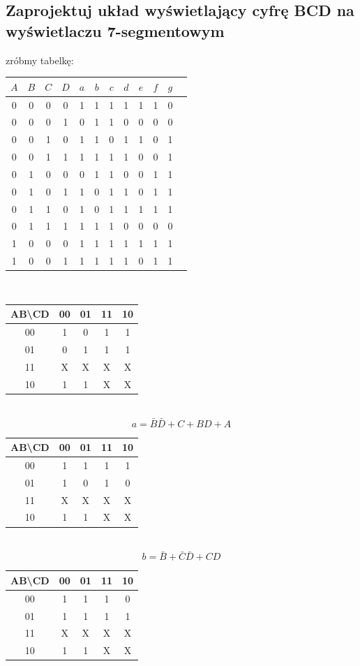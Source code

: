 \documentclass{article}
\begin{document}
\begin{enumerate}
\begin{enumerate}
	\section{Zaprojektuj układ wyświetlający cyfrę BCD na wyświetlaczu 7-segmentowym}
	zróbmy tabelkę:
	\begin{center}
	\begin{tabular}{|c|c|c|c||c|c|c|c|c|c|c|c|} 
	 \hline
	$A$ & $B$ & $C$ & $D$ & $a$ & $b$ & $c$ & $d$ & $e$ & $f$ & $g$ \\ 
	 \hline \hline
	 0&0&0&0& 1&1&1&1&1&1&0\\ \hline
	 0&0&0&1& 0&1&1&0&0&0&0\\ \hline
	 0&0&1&0& 1&1&0&1&1&0&1\\ \hline
	 0&0&1&1& 1&1&1&1&0&0&1\\ \hline
	 0&1&0&0& 0&1&1&0&0&1&1\\ \hline	 
	 0&1&0&1& 1&0&1&1&0&1&1\\ \hline
	 0&1&1&0& 1&0&1&1&1&1&1\\ \hline
	 0&1&1&1& 1&1&1&0&0&0&0\\ \hline
	 1&0&0&0& 1&1&1&1&1&1&1\\ \hline
	 1&0&0&1& 1&1&1&1&0&1&1\\ \hline
	\end{tabular}\\
	\begin{tabular}{|c|c|c|c|c|} 
	 \hline
	AB\textbackslash CD& 00 & 01 & 11 & 10\\  \hline
	 				 00&1&0&1&1\\ \hline
	 				 01&0&1&1&1\\ \hline
	 				 11&X&X&X&X\\ \hline
	 				 10&1&1&X&X\\ \hline
	
	\end{tabular}\\
	$$a= \bar{B}\bar{D} + C + BD + A$$
	\begin{tabular}{|c|c|c|c|c|} 
	 \hline
	AB\textbackslash CD& 00 & 01 & 11 & 10\\  \hline
	 				 00&1&1&1&1\\ \hline
	 				 01&1&0&1&0\\ \hline
	 				 11&X&X&X&X\\ \hline
	 				 10&1&1&X&X\\ \hline
	\end{tabular}\\
	$$b= \bar{B} + \bar{C}\bar{D} + CD$$
	\begin{tabular}{|c|c|c|c|c|} 
	 \hline
	AB\textbackslash CD& 00 & 01 & 11 & 10\\  \hline
	 				 00&1&1&1&0\\ \hline
	 				 01&1&1&1&1\\ \hline
	 				 11&X&X&X&X\\ \hline
	 				 10&1&1&X&X\\ \hline
	

\end{tabular}
\end{center}
\end{enumerate}
\end{enumerate}
\end{document}
